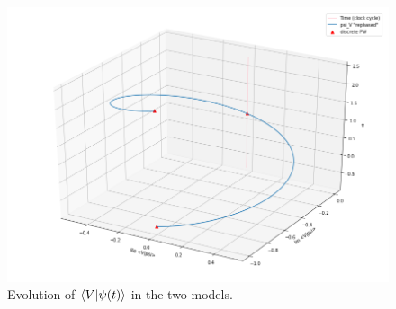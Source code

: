 \begin{figure}
  \includegraphics[width=\textwidth]{img/psi_V.png}
  \caption{Evolution of $\braket{V}{\psi(t)}$ in the two models.}
  \label{fig:psi_V}
\end{figure}
